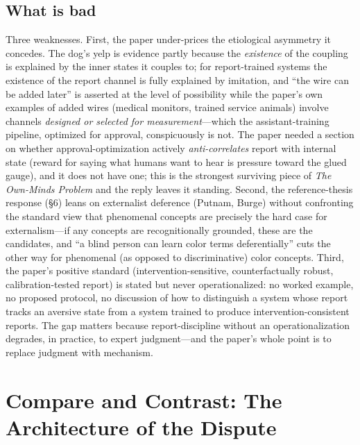 \documentclass[11pt]{article}
\newcommand{\OM}{\emph{The Own-Minds Problem}}
\begin{document}
\subsection{What is bad}
Three weaknesses. First, the paper under-prices the etiological asymmetry it concedes. The dog's yelp is evidence partly because the \emph{existence} of the coupling is explained by the inner states it couples to; for report-trained systems the existence of the report channel is fully explained by imitation, and ``the wire can be added later'' is asserted at the level of possibility while the paper's own examples of added wires (medical monitors, trained service animals) involve channels \emph{designed or selected for measurement}---which the assistant-training pipeline, optimized for approval, conspicuously is not. The paper needed a section on whether approval-optimization actively \emph{anti-correlates} report with internal state (reward for saying what humans want to hear is pressure toward the glued gauge), and it does not have one; this is the strongest surviving piece of \OM{} and the reply leaves it standing. Second, the reference-thesis response (\S 6) leans on externalist deference (Putnam, Burge) without confronting the standard view that phenomenal concepts are precisely the hard case for externalism---if any concepts are recognitionally grounded, these are the candidates, and ``a blind person can learn color terms deferentially'' cuts the other way for phenomenal (as opposed to discriminative) color concepts. Third, the paper's positive standard (intervention-sensitive, counterfactually robust, calibration-tested report) is stated but never operationalized: no worked example, no proposed protocol, no discussion of how to distinguish a system whose report tracks an aversive state from a system trained to produce intervention-consistent reports. The gap matters because report-discipline without an operationalization degrades, in practice, to expert judgment---and the paper's whole point is to replace judgment with mechanism.

\section{Compare and Contrast: The Architecture of the Dispute}
\end{document}
